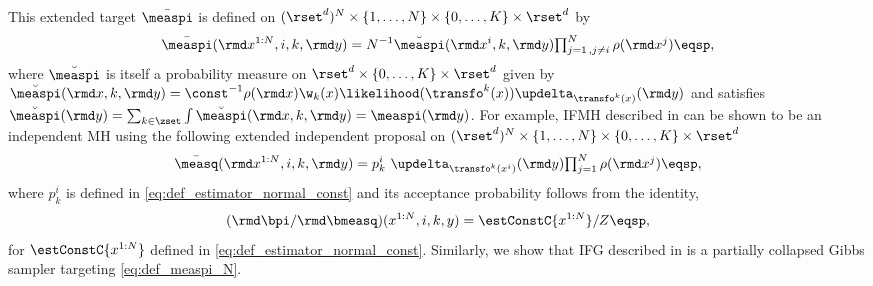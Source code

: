 This extended target $\bar{\measpi}$ is defined on
$(\rset^{d})^{N} \times \{1,\ldots,N\}\times \{0,\ldots,K\} \times \rset^{d}$ by 
\begin{equation}\label{eq:def_measpi_N}
  \bar{\measpi}(\rmd x^{1:N},i,k,\rmd y)  =   N^{-1} \breve{\measpi}(\rmd x^i,k,\rmd y)  \textstyle{\prod_{j=1\, 
  , j\neq i}^N \rho(\rmd x^{j})} \eqsp, %
\end{equation}
where $\breve{\measpi}$ is itself a probability measure on
$\rset^{d}\times \{0,\ldots,K\} \times \rset^{d}$ given by $\breve{\measpi}( \rmd x, k, \rmd y) =  \const^{-1} \rho(\rmd x) \w_k(x) \likelihood(\transfo^{k}(x)) \updelta_{\transfo^k(x)} (\rmd y)$ and satisfies $ \breve{\measpi}(\rmd y)=\sum_{k \in \zset} \int \breve{\measpi}( \rmd x, k, \rmd y)=\measpi(\rmd y)$.
For example, IFMH described in  can be shown to be an independent MH using the following extended  independent proposal on 
$(\rset^{d})^{N} \times \{1,\ldots,N\}\times \{0,\ldots,K\} \times \rset^{d}$
\begin{equation}\label{eq:extendedproposal}
  \bar{\measq}(\rmd x^{1:N},i,k,\rmd y)=p_k^i~\updelta_{\transfo^{k}(x^{i})}(\rmd y) \textstyle{\prod_{j=1}^{N}\rho(\rmd x^{j})} \eqsp,
\end{equation} where  $p_k^i$ is defined in \eqref{eq:def_estimator_normal_const}  
and its acceptance probability follows from the identity,
\begin{equation}\label{eq:rationextendedtargetproposal}
  (\rmd\bpi/\rmd \bmeasq)(x^{1:N},i,k,y)=\estConstC{x^{1:N}}/Z \eqsp,
\end{equation}
for $\estConstC{x^{1:N}}$ defined in \eqref{eq:def_estimator_normal_const}. Similarly, we show that IFG described in  is a partially collapsed Gibbs sampler targeting \eqref{eq:def_measpi_N}.


